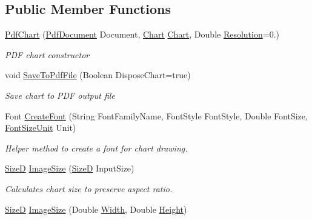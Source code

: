 \subsection*{Public Member Functions}
\begin{DoxyCompactItemize}
\item 
\hyperlink{class_pdf_file_writer_1_1_pdf_chart_ae820eb79429c5447eb2f994f297e1795}{Pdf\+Chart} (\hyperlink{class_pdf_file_writer_1_1_pdf_document}{Pdf\+Document} Document, \hyperlink{class_pdf_file_writer_1_1_pdf_chart_aa08931d631c7d005f289c4960423a305}{Chart} \hyperlink{class_pdf_file_writer_1_1_pdf_chart_aa08931d631c7d005f289c4960423a305}{Chart}, Double \hyperlink{class_pdf_file_writer_1_1_pdf_chart_aa948dfd08bf85fb6d1e5d1376d18d922}{Resolution}=0.)
\begin{DoxyCompactList}\small\item\em P\+DF chart constructor \end{DoxyCompactList}\item 
void \hyperlink{class_pdf_file_writer_1_1_pdf_chart_a47736a8d42232d870b2f3e77fdcb6eb7}{Save\+To\+Pdf\+File} (Boolean Dispose\+Chart=true)
\begin{DoxyCompactList}\small\item\em Save chart to P\+DF output file \end{DoxyCompactList}\item 
Font \hyperlink{class_pdf_file_writer_1_1_pdf_chart_aa19a6349d6edefd228243bb286020389}{Create\+Font} (String Font\+Family\+Name, Font\+Style Font\+Style, Double Font\+Size, \hyperlink{namespace_pdf_file_writer_adf167276d483eb5d597fed4e3297ba17}{Font\+Size\+Unit} Unit)
\begin{DoxyCompactList}\small\item\em Helper method to create a font for chart drawing. \end{DoxyCompactList}\item 
\hyperlink{class_pdf_file_writer_1_1_size_d}{SizeD} \hyperlink{class_pdf_file_writer_1_1_pdf_chart_a78959dc9b7f5cf29bbf798912a189602}{Image\+Size} (\hyperlink{class_pdf_file_writer_1_1_size_d}{SizeD} Input\+Size)
\begin{DoxyCompactList}\small\item\em Calculates chart size to preserve aspect ratio. \end{DoxyCompactList}\item 
\hyperlink{class_pdf_file_writer_1_1_size_d}{SizeD} \hyperlink{class_pdf_file_writer_1_1_pdf_chart_adbcdc2103a19db0c31ff315c40bfc438}{Image\+Size} (Double \hyperlink{class_pdf_file_writer_1_1_pdf_chart_a2bbac5f243d2593a15a68c17283765de}{Width}, Double \hyperlink{class_pdf_file_writer_1_1_pdf_chart_a4216487a4cf01f891007685a128bd328}{Height})

\end{DoxyCompactItemize}
